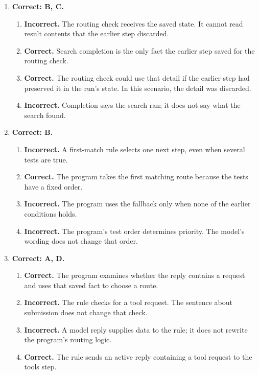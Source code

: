 \begin{enumerate}[start=21,itemsep=0.7\baselineskip]
\item[{\hyperref[exercise:21]{21.}}] \begin{minipage}[t]{\linewidth}
\textbf{Correct: B, C.}
\begin{enumerate}[label=\textnormal{(\Alph*)},leftmargin=*,itemsep=0pt]
\item \textbf{Incorrect.} The routing check receives the saved state. It cannot read result contents that the earlier step discarded.
\item \textbf{Correct.} Search completion is the only fact the earlier step saved for the routing check.
\item \textbf{Correct.} The routing check could use that detail if the earlier step had preserved it in the run's state. In this scenario, the detail was discarded.
\item \textbf{Incorrect.} Completion says the search ran; it does not say what the search found.
\end{enumerate}
\end{minipage}

\item[{\hyperref[exercise:22]{22.}}] \begin{minipage}[t]{\linewidth}
\textbf{Correct: B.}
\begin{enumerate}[label=\textnormal{(\Alph*)},leftmargin=*,itemsep=0pt]
\item \textbf{Incorrect.} A first-match rule selects one next step, even when several tests are true.
\item \textbf{Correct.} The program takes the first matching route because the tests have a fixed order.
\item \textbf{Incorrect.} The program uses the fallback only when none of the earlier conditions holds.
\item \textbf{Incorrect.} The program's test order determines priority. The model's wording does not change that order.
\end{enumerate}
\end{minipage}

\item[{\hyperref[exercise:23]{23.}}] \begin{minipage}[t]{\linewidth}
\textbf{Correct: A, D.}
\begin{enumerate}[label=\textnormal{(\Alph*)},leftmargin=*,itemsep=0pt]
\item \textbf{Correct.} The program examines whether the reply contains a request and uses that saved fact to choose a route.
\item \textbf{Incorrect.} The rule checks for a tool request. The sentence about submission does not change that check.
\item \textbf{Incorrect.} A model reply supplies data to the rule; it does not rewrite the program's routing logic.
\item \textbf{Correct.} The rule sends an active reply containing a tool request to the tools step.
\end{enumerate}
\end{minipage}


\end{enumerate}
